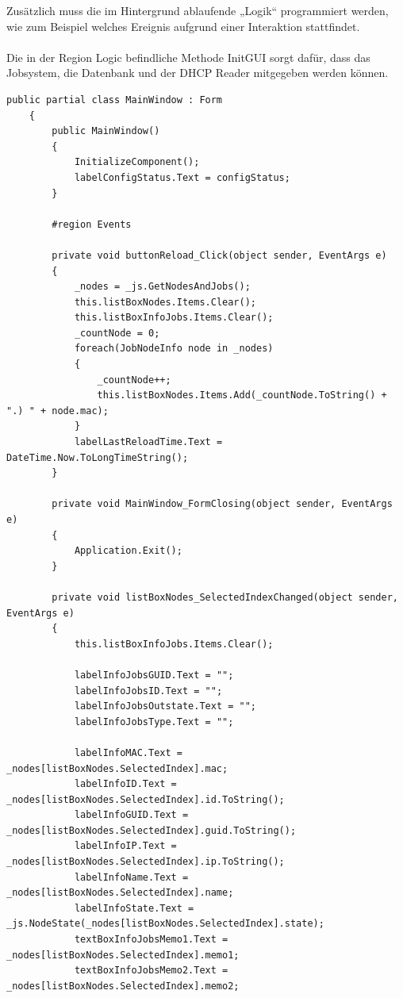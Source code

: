 \documentclass[12pt,a4paper]{report}
\begin{document}
\begin{onehalfspace}
Zusätzlich muss die im Hintergrund ablaufende „Logik“ programmiert werden, wie zum Beispiel welches Ereignis aufgrund einer Interaktion stattfindet.\\\\
Die in der Region Logic befindliche Methode InitGUI sorgt dafür, dass das Jobsystem, die Datenbank und der DHCP Reader mitgegeben werden können.\\
\begin{lstlisting}
public partial class MainWindow : Form
    {
		public MainWindow()
        {
            InitializeComponent();
            labelConfigStatus.Text = configStatus;
        }

        #region Events

        private void buttonReload_Click(object sender, EventArgs e)
        {
            _nodes = _js.GetNodesAndJobs();
            this.listBoxNodes.Items.Clear();
            this.listBoxInfoJobs.Items.Clear();
            _countNode = 0;
            foreach(JobNodeInfo node in _nodes)
            {
                _countNode++;
                this.listBoxNodes.Items.Add(_countNode.ToString() + ".) " + node.mac);
            }
            labelLastReloadTime.Text = DateTime.Now.ToLongTimeString();
        }

        private void MainWindow_FormClosing(object sender, EventArgs e)
        {
            Application.Exit();
        }

        private void listBoxNodes_SelectedIndexChanged(object sender, EventArgs e)
        {
            this.listBoxInfoJobs.Items.Clear();

            labelInfoJobsGUID.Text = "";
            labelInfoJobsID.Text = "";
            labelInfoJobsOutstate.Text = "";
            labelInfoJobsType.Text = "";

            labelInfoMAC.Text = _nodes[listBoxNodes.SelectedIndex].mac;
            labelInfoID.Text = _nodes[listBoxNodes.SelectedIndex].id.ToString();
            labelInfoGUID.Text = _nodes[listBoxNodes.SelectedIndex].guid.ToString();
            labelInfoIP.Text = _nodes[listBoxNodes.SelectedIndex].ip.ToString();
            labelInfoName.Text = _nodes[listBoxNodes.SelectedIndex].name;
            labelInfoState.Text = _js.NodeState(_nodes[listBoxNodes.SelectedIndex].state);
            textBoxInfoJobsMemo1.Text = _nodes[listBoxNodes.SelectedIndex].memo1;
            textBoxInfoJobsMemo2.Text = _nodes[listBoxNodes.SelectedIndex].memo2;




\end{lstlisting}
\end{onehalfspace}
\end{document}
